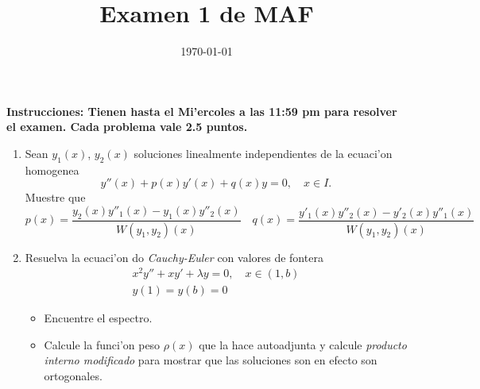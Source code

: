 \documentclass[letterpaper]{article}
\date{\today}
\title{Examen 1 de MAF}
\begin{document}
\maketitle
\noindent\textbf{Instrucciones: Tienen hasta el Mi'ercoles a las 11:59 pm para resolver el examen. Cada problema vale 2.5 puntos.}

\begin{enumerate}

  \item Sean $y_{1}(x)$, $y_{2}(x)$ soluciones linealmente independientes de la ecuaci'on homogenea
        \[
            y''(x)+p(x)y'(x)+q(x)y=0,\quad x\in I.
        \]
        Muestre que
        \[
        p(x)=\frac{y_{2}(x)y''_{1}(x)-y_{1}(x)y''_{2}(x)}{W(y_{1},y_{2})(x)}\quad q(x)=\frac{y'_{1}(x)y''_{2}(x)-y'_{2}(x)y''_{1}(x)}{W(y_{1},y_{2})(x)}
        \]

  \item Resuelva la ecuaci'on do \emph{Cauchy-Euler} con valores de fontera
        \begin{align*}
          x^{2}y''+xy'+\lambda y=0,\quad x\in(1,b)\\
          y(1)=y(b)=0
        \end{align*}
        \begin{itemize}
          \item Encuentre el espectro.
          \item Calcule la funci'on peso $\rho(x)$ que la hace autoadjunta y calcule \emph{producto interno modificado} para mostrar que las soluciones son en efecto son ortogonales.
        \end{itemize}


\end{enumerate}
\end{document}
